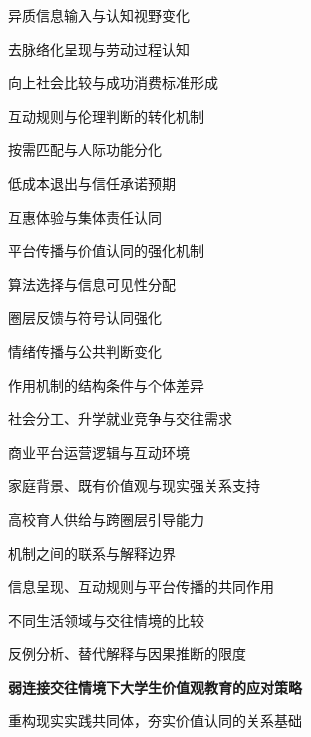 \begin{thesisframework}
\begin{thesisoutline}
\begin{thesisoutline}
    \begin{thesisoutline}
      \item 异质信息输入与认知视野变化
      \item 去脉络化呈现与劳动过程认知
      \item 向上社会比较与成功消费标准形成
    \end{thesisoutline}
    \item 互动规则与伦理判断的转化机制
    \begin{thesisoutline}
      \item 按需匹配与人际功能分化
      \item 低成本退出与信任承诺预期
      \item 互惠体验与集体责任认同
    \end{thesisoutline}
    \item 平台传播与价值认同的强化机制
    \begin{thesisoutline}
      \item 算法选择与信息可见性分配
      \item 圈层反馈与符号认同强化
      \item 情绪传播与公共判断变化
    \end{thesisoutline}
    \item 作用机制的结构条件与个体差异
    \begin{thesisoutline}
      \item 社会分工、升学就业竞争与交往需求
      \item 商业平台运营逻辑与互动环境
      \item 家庭背景、既有价值观与现实强关系支持
      \item 高校育人供给与跨圈层引导能力
    \end{thesisoutline}
    \item 机制之间的联系与解释边界
    \begin{thesisoutline}
      \item 信息呈现、互动规则与平台传播的共同作用
      \item 不同生活领域与交往情境的比较
      \item 反例分析、替代解释与因果推断的限度
    \end{thesisoutline}
  \end{thesisoutline}
  \item \textbf{弱连接交往情境下大学生价值观教育的应对策略}
  \begin{thesisoutline}
    \item 重构现实实践共同体，夯实价值认同的关系基础
    \begin{thesisoutline}

\end{thesisoutline}
\end{thesisoutline}
\end{thesisoutline}
\end{thesisframework}
